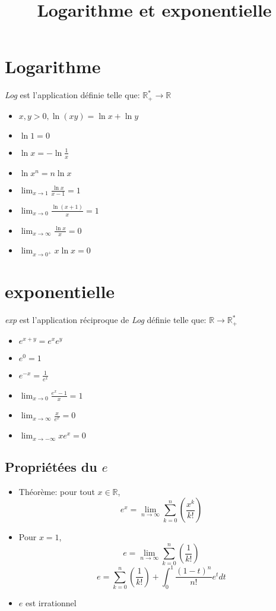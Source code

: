 \documentclass{article}
\title{Logarithme et exponentielle}
\date{}
\begin{document}
\maketitle

\section{Logarithme}
\emph{Log} est l'application d\'{e}finie telle que: \(\mathbb{R}^*_+ \rightarrow \mathbb{R}\)
	\begin{itemize}
	\item $ x,y>0, \ln (xy) = \ln x + \ln y $
	\item $ \ln 1 = 0 $
	\item $ \ln x = -\ln \frac{1}{x} $
	\item $ \ln x^n = n\ln x $
	\newline

	\item $ \lim_{x\to 1} \frac{\ln x}{x-1} = 1 $
	\item $ \lim_{x\to 0} \frac{\ln (x+1)}{x} = 1 $
	\item $ \lim_{x\to\infty} \frac{\ln x}{x} = 0 $
	\item $ \lim_{x\to 0^+} x\ln x = 0 $
	\end{itemize}

\section{exponentielle}
\emph{exp} est l'application r\'{e}ciproque de \emph{Log} d\'{e}finie telle que: \(\mathbb{R} \rightarrow \mathbb{R}^*_+\)
	\begin{itemize}
	\item $ e^{x+y} = e^xe^y $
	\item $ e^0 = 1 $
	\item $ e^{-x} = \frac{1}{e^x} $
	\newline

	\item $ \lim_{x\to 0} \frac{e^x-1}{x} = 1 $
	\item $ \lim_{x\to\infty} \frac{x}{e^x} = 0 $
	\item $ \lim_{x\to-\infty} xe^x = 0 $
	\end{itemize}

\subsection{Propri\'{e}t\'{e}es du $e$}
\begin{itemize}
	\item Th\'{e}or\`{e}me: pour tout $x \in \mathbb{R}$,
	$$ e^x = \lim_{n\to\infty} \sum_{k=0}^{n} (\frac{x^k}{k!}) $$

	\item Pour $x = 1$,
	$$ e = \lim_{n\to\infty} \sum_{k=0}^{n} (\frac{1}{k!}) $$
	$$ e = \sum_{k=0}^{n} (\frac{1}{k!}) + \int_{0}^{1} \frac{(1-t)^n}{n!}e^tdt $$

	\item $e$ est irrationnel
\end{itemize}
\end{document}
